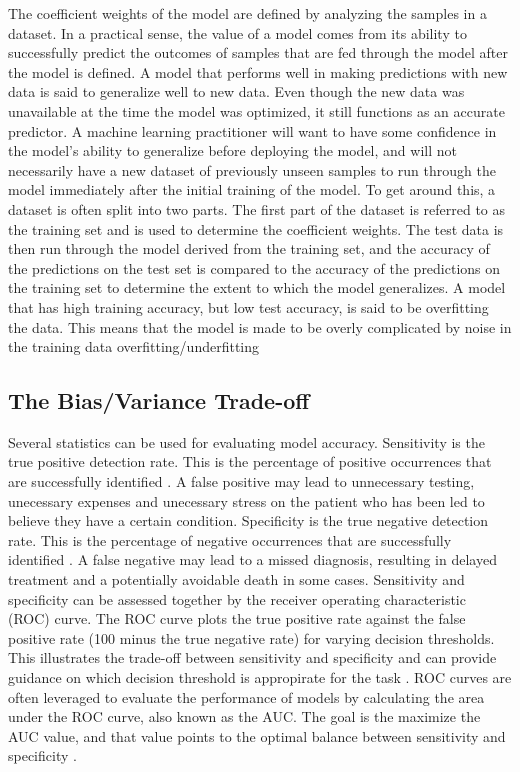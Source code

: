 \documentclass[sigconf]{acmart}
\begin{document}
The coefficient weights of the model are defined by analyzing the samples in a dataset. In a practical sense, the value of a model comes from its ability to successfully predict the outcomes of samples that are fed through the model after the model is defined. A model that performs well in making predictions with new data is said to generalize well to new data. Even though the new data was unavailable at the time the model was optimized, it still functions as an accurate predictor.
A machine learning practitioner will want to have some confidence in the model's ability to generalize before deploying the model, and will not necessarily have a new dataset of previously unseen samples to run through the model immediately after the initial training of the model. To get around this, a dataset is often split into two parts. The first part of the dataset is referred to as the training set and is used to determine the coefficient weights. The test data is then run through the model derived from the training set, and the accuracy of the predictions on the test set is compared to the accuracy of the predictions on the training set to determine the extent to which the model generalizes.
A model that has high training accuracy, but low test accuracy, is said to be overfitting the data. This means that the model is made to be overly complicated by noise in the training data
overfitting/underfitting

\subsection{The Bias/Variance Trade-off}


Several statistics can be used for evaluating model accuracy. Sensitivity is the true positive detection rate. This is the percentage of positive occurrences that are successfully identified \cite{cite12}. A false positive may lead to unnecessary testing, unecessary expenses and unecessary stress on the patient who has been led to believe they have a certain condition. Specificity is the true negative detection rate. This is the percentage of negative occurrences that are successfully identified \cite{cite12}. A false negative may lead to a missed diagnosis, resulting in delayed treatment and a potentially avoidable death in some cases. Sensitivity and specificity can be assessed together by the receiver operating characteristic (ROC) curve. The ROC curve plots the true positive rate against the false positive rate (100 minus the true negative rate) for varying decision thresholds. This illustrates the trade-off between sensitivity and specificity and can provide guidance on which decision threshold is appropirate for the task \cite{cite12}. ROC curves are often leveraged to evaluate the performance of models by calculating the area under the ROC curve, also known as the AUC. The goal is the maximize the AUC value, and that value points to the optimal balance between sensitivity and specificity \cite{cite12}.
\end{document}

